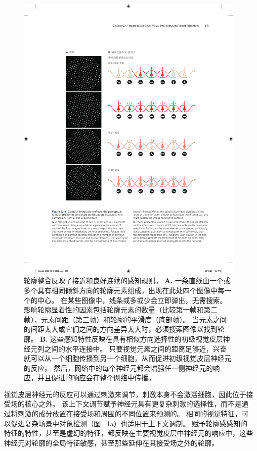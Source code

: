 \begin{figure}[htbp]
	\centering
	\includegraphics[width=1.0\linewidth]{chap23/fig_23_6}
	\caption{轮廓整合反映了接近和良好连续的感知规则\cite{li2002global}。
		\textbf{A.} 一条直线由一个或多个具有相同倾斜方向的轮廓元素组成，出现在此处四个图像中每一个的中心。
		在某些图像中，线条或多或少会立即弹出，无需搜索。
		影响轮廓显着性的因素包括轮廓元素的数量（比较第一帧和第二帧）、元素间距（第三帧）和轮廓的平滑度（底部帧）。
		当元素之间的间距太大或它们之间的方向差异太大时，必须搜索图像以找到轮廓。
		\textbf{B.} 这些感知特性反映在具有相似方向选择性的初级视觉皮层神经元列之间的水平连接中。
		只要视觉元素之间的距离足够近，兴奋就可以从一个细胞传播到另一个细胞，从而促进初级视觉皮层神经元的反应。
		然后，网络中的每个神经元都会增强任一侧神经元的响应，并且促进的响应会在整个网络中传播。}
	\label{fig:23_6}
\end{figure}


视觉皮层神经元的反应可以通过刺激来调节，刺激本身不会激活细胞，因此位于接受场的核心之外。
该上下文调节赋予神经元具有更复杂刺激的选择性，而不是通过将刺激的成分放置在接受场和周围的不同位置来预测的。
相同的视觉特征，可以促进复杂场景中对象检测（图 ~\ref{fig:23_6}a）也适用于上下文调制。
赋予轮廓感感知的特征的特性，甚至是虚幻的特征，都反映在主要视觉皮层中神经元的响应中，这些神经元对轮廓的全局特征敏感，甚至那些延伸在其接受场之外的轮廓。


